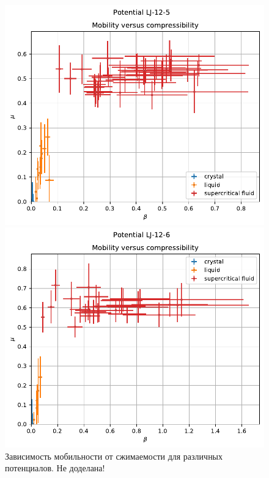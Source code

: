 \documentclass[pdf,hyperref={unicode}]{beamer}
\begin{document}
\begin{frame}
\begin{figure}[h]
\begin{center}
\begin{minipage}[h]{0.35\linewidth}
\includegraphics[width=\textwidth, keepaspectratio]{plot_compress_mobility_Potential LJ-12-5_1}
\end{minipage}
\begin{minipage}[h]{0.35\linewidth}
\includegraphics[width=\textwidth, keepaspectratio]{plot_compress_mobility_Potential LJ-12-6_1}
\end{minipage}
\caption{\tiny Зависимость мобильности от сжимаемости для различных потенциалов. Не доделана!}
\label{risMuBeta}
\end{center}
\end{figure}

\end{frame}
\end{document}
